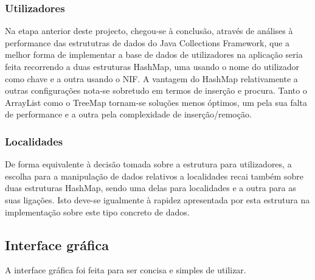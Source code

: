 \documentclass[a5paper,twocolumn, 11pt]{article}
\begin{document}
\subsubsection{Utilizadores}
Na etapa anterior deste projecto, chegou-se à conclusão, através de análises à performance das estrututras de dados do Java Collections Framework, que a melhor forma de implementar a base de dados de utilizadores na aplicação seria feita recorrendo a duas estruturas HashMap, uma usando o nome do utilizador como chave e a outra usando o NIF. A vantagem do HashMap relativamente a outras configurações nota-se sobretudo em termos de inserção e procura. Tanto o ArrayList como o TreeMap tornam-se soluções menos óptimos, um pela sua falta de performance e a outra pela complexidade de inserção/remoção.

\subsubsection{Localidades}
De forma equivalente à decisão tomada sobre a estrutura para utilizadores, a escolha para a manipulação de dados relativos a localidades recai também sobre duas estruturas HashMap, sendo uma delas para localidades e a outra para as suas ligações. Isto deve-se igualmente à rapidez apresentada por esta estrutura na implementação sobre este tipo concreto de dados.
\clearpage
\newpage

\subsection{Interface gráfica}
A interface gráfica foi feita para ser concisa e simples de utilizar.
\end{document}
